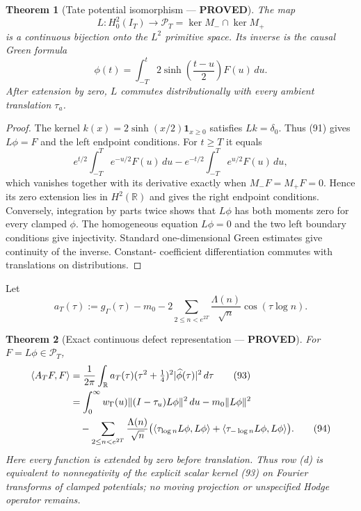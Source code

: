 \documentclass[11pt]{article}
\newtheorem{theorem}{Theorem}
\newcommand{\PROVED}{\textcolor{green!45!black}{\textbf{PROVED}}}
\begin{document}
\begin{theorem}[Tate potential isomorphism --- \PROVED]
The map
\begin{equation}
 L:H_0^2(I_T)\longrightarrow
 \mathcal P_T=\ker M_-\cap\ker M_+                 \tag{90}
\end{equation}
is a continuous bijection onto the $L^2$ primitive space.  Its inverse is
the causal Green formula
\begin{equation}
 \phi(t)=\int_{-T}^{t}2\sinh\!\left(\frac{t-u}{2}\right)F(u)\,du.
                                                               \tag{91}
\end{equation}
After extension by zero, $L$ commutes distributionally with every ambient
translation $\tau_a$.
\end{theorem}

\begin{proof}
The kernel $k(x)=2\sinh(x/2)\mathbf1_{x\ge0}$ satisfies $Lk=\delta_0$.
Thus (91) gives $L\phi=F$ and the left endpoint conditions.  For $t\ge T$ it
equals
\[
 e^{t/2}\int_{-T}^{T}e^{-u/2}F(u)\,du
 -e^{-t/2}\int_{-T}^{T}e^{u/2}F(u)\,du,
\]
which vanishes together with its derivative exactly when $M_-F=M_+F=0$.
Hence its zero extension lies in $H^2(\mathbb R)$ and gives the right endpoint
conditions.  Conversely, integration by parts twice shows that $L\phi$ has
both moments zero for every clamped $\phi$.  The homogeneous equation
$L\phi=0$ and the two left boundary conditions give injectivity.  Standard
one-dimensional Green estimates give continuity of the inverse.  Constant-
coefficient differentiation commutes with translations on distributions.
\end{proof}

Let
\begin{equation}
 a_T(\tau):=g_\Gamma(\tau)-m_0
 -2\sum_{2\le n<e^{2T}}\frac{\Lambda(n)}{\sqrt n}
        \cos(\tau\log n).                              \tag{92}
\end{equation}

\begin{theorem}[Exact continuous defect representation --- \PROVED]
For $F=L\phi\in\mathcal P_T$,
\begin{align}
 \langle A_TF,F\rangle
 &=\frac1{2\pi}\int_{\mathbb R}
       a_T(\tau)(\tau^2+\tfrac14)^2
       |\widehat\phi(\tau)|^2\,d\tau                 \tag{93}\\
 &=\int_0^\infty w_\Gamma(u)
       \|(I-\tau_u)L\phi\|^2\,du
   -m_0\|L\phi\|^2 \notag\\
 &\quad-\sum_{2\le n<e^{2T}}\frac{\Lambda(n)}{\sqrt n}
       \bigl(\langle\tau_{\log n}L\phi,L\phi\rangle
             +\langle\tau_{-\log n}L\phi,L\phi\rangle\bigr). \tag{94}
\end{align}
Here every function is extended by zero before translation.  Thus row (d)
is equivalent to nonnegativity of the explicit scalar kernel (93) on Fourier
transforms of clamped potentials; no moving projection or unspecified Hodge
operator remains.
\end{theorem}
\end{document}
